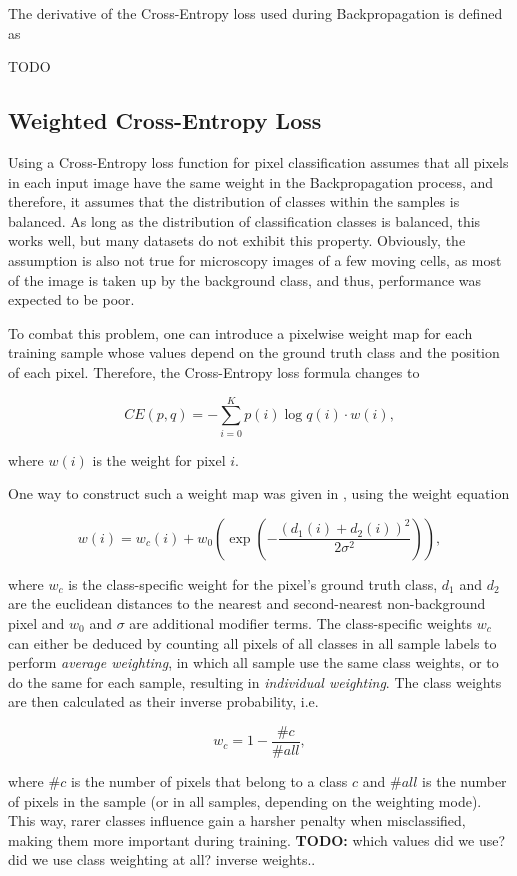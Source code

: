 \noindent The derivative of the Cross-Entropy loss used during Backpropagation is defined as

TODO


		\subsection{Weighted Cross-Entropy Loss}

Using a Cross-Entropy loss function for pixel classification assumes that all pixels in each input image have the same weight in the Backpropagation process, and therefore, it assumes that the distribution of classes within the samples is balanced. As long as the distribution of classification classes is balanced, this works well, but many datasets do not exhibit this property. Obviously, the assumption is also not true for microscopy images of a few moving cells, as most of the image is taken up by the background class, and thus, performance was expected to be poor.

To combat this problem, one can introduce a pixelwise weight map for each training sample whose values depend on the ground truth class and the position of each pixel. Therefore, the Cross-Entropy loss formula changes to

\[CE(p, q) = -\sum \limits_{i = 0}^{K} p(i) \log q(i) \cdot w(i),\]

\noindent where $w(i)$ is the weight for pixel $i$.

One way to construct such a weight map was given in \cite{unet}, using the weight equation

\[ w(i) = w_c(i) + w_0 \left ( \exp \left (- \frac{(d_1(i) + d_2(i))^2}{2\sigma^2} \right ) \right ), \]

\noindent where $w_c$ is the class-specific weight for the pixel's ground truth class, $d_1$ and $d_2$ are the euclidean distances to the nearest and second-nearest non-background pixel and $w_0$ and $\sigma$ are additional modifier terms. The class-specific weights $w_c$ can either be deduced by counting all pixels of all classes in all sample labels to perform \textit{average weighting}, in which all sample use the same class weights, or to do the same for each sample, resulting in \textit{individual weighting}. The class weights are then calculated as their inverse probability, i.e.

\[ w_c = 1 - \frac{\#c}{\#all}, \]

\noindent where $\#c$ is the number of pixels that belong to a class $c$ and $\#all$ is the number of pixels in the sample (or in all samples, depending on the weighting mode). This way, rarer classes influence gain a harsher penalty when misclassified, making them more important during training.  \textbf{TODO:} which values did we use? did we use class weighting at all? inverse weights..


